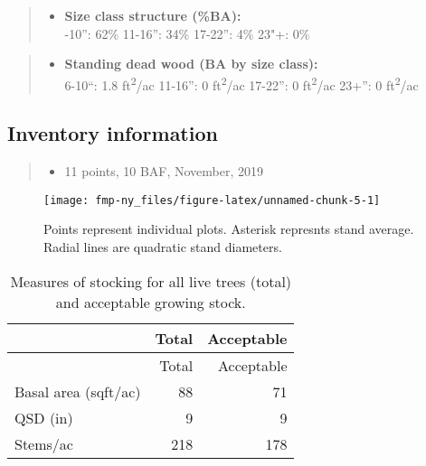\documentclass[]{tufte-handout}
\providecommand{\tightlist}{%
  \setlength{\itemsep}{0pt}\setlength{\parskip}{0pt}}
\begin{document}
\begin{quote}
\begin{itemize}
\tightlist
\item
  \textbf{Size class structure (\%BA):}\\
  \vspace{2pt} -10'': 62\% \textbar{} 11-16'': 34\% \textbar{}
  17-22'': 4\% \textbar{} 23"+: 0\%
\end{itemize}
\end{quote}

\begin{quote}
\begin{itemize}
\tightlist
\item
  \textbf{Standing dead wood (BA by size class):}\\
  \vspace{2pt} \indent \small 6-10``: 1.8 ft\textsuperscript{2}/ac
  \textbar{} 11-16'': 0 ft\textsuperscript{2}/ac \textbar{} 17-22'': 0
  ft\textsuperscript{2}/ac \textbar{} 23+'': 0 ft\textsuperscript{2}/ac
\end{itemize}
\end{quote}

\subsection{Inventory information}\label{inventory-information}

\begin{quote}
\begin{itemize}
\tightlist
\item
  11 points, 10 BAF, November, 2019
\end{itemize}
\end{quote}

\begin{figure}
\texttt{[image: fmp-ny\_files/figure-latex/unnamed-chunk-5-1]} \caption[Points represent individual plots]{Points represent individual plots. Asterisk represnts stand average. Radial lines are quadratic stand diameters.}\label{fig:unnamed-chunk-5}
\end{figure}

\begin{longtable}[]{@{}lrr@{}}
\caption{Measures of stocking for all live trees (total) and acceptable
growing stock.}\tabularnewline
\toprule
& Total & Acceptable\tabularnewline
\midrule
\endfirsthead
\toprule
& Total & Acceptable\tabularnewline
\midrule
\endhead
Basal area (sqft/ac) & 88 & 71\tabularnewline
QSD (in) & 9 & 9\tabularnewline
Stems/ac & 218 & 178\tabularnewline
\bottomrule
\end{longtable}
\end{document}

